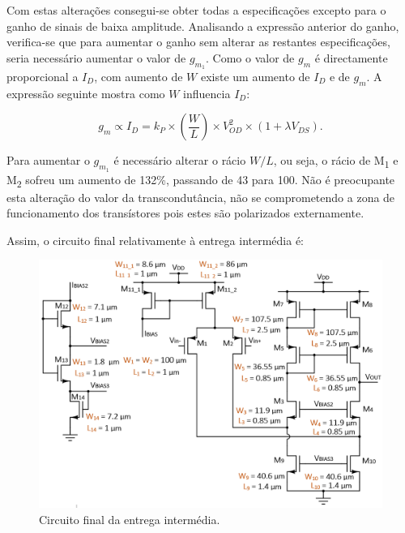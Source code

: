 \documentclass[11pt]{article}
\numberwithin{equation}{section}
\begin{document}
Com estas alterações consegui-se obter todas a especificações excepto para o ganho de sinais de baixa amplitude. Analisando a expressão anterior do ganho, verifica-se que para aumentar o ganho sem alterar as restantes especificações, seria necessário aumentar o valor de $g_{m_1}$. Como o valor de $g_m$ é directamente proporcional a $I_D$, com aumento de $W$ existe um aumento de $I_D$ e de $g_m$. A expressão seguinte mostra como $W$ influencia $I_D$:

\vspace{-3mm}
\begin{equation}
g_{m} \propto I_{D}= k_P \times \left(\frac{W}{L}\right) \times V_{OD}^2 \times \left(1+\lambda V_{DS}\right).
\end{equation}

Para aumentar o $g_{m_1}$ é necessário alterar o rácio $W/L$, ou seja, o rácio de M\textsubscript{1} e M\textsubscript{2} sofreu um aumento de 132\%, passando de 43 para 100. Não é preocupante esta alteração do valor da transcondutância, não se comprometendo a zona de funcionamento dos transístores pois estes são polarizados externamente.


Assim, o circuito final relativamente à entrega intermédia é:

\begin{figure}[H]
	\centering
	\includegraphics[keepaspectratio=true, scale=0.42]{teoricas/circuitoantesdadiv}
	\vspace{-0.5em}
	\caption{Circuito final da entrega intermédia.}
	\vspace{-0.8em}
	\label{fig:finalint}
\end{figure} 
\end{document}

